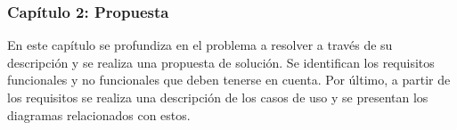 %
%
%

\subsubsection*{Capítulo 2: Propuesta}
En este capítulo se profundiza en el problema a resolver a través de su descripción y se realiza una propuesta de solución. Se identifican los requisitos funcionales y no funcionales que deben tenerse en cuenta. Por último, a partir de los requisitos se realiza una descripción de los casos de uso y se presentan los diagramas relacionados con estos.

%
%
 

